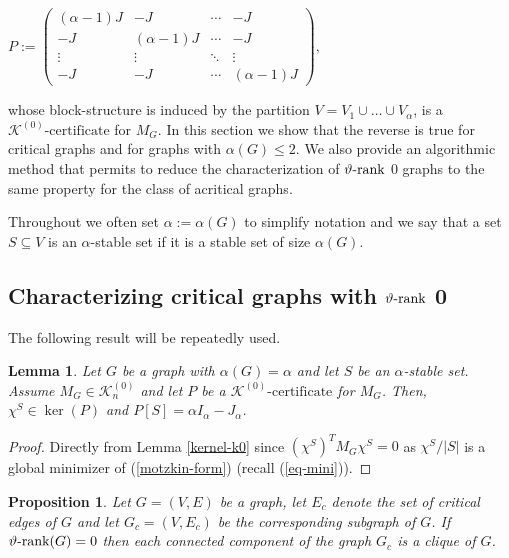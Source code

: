 \documentclass[11pt]{article}
\newtheorem{lemma}[theorem]{Lemma}
\newtheorem{proposition}[theorem]{Proposition}
\newcommand{\kzero}{\mathcal{K}_n^{(0)}}
\newcommand{\kzeroc}{\MK^{(0)}\text{-certificate}}
\numberwithin{equation}{section}
\newcommand{\MK}{{\mathcal K}}
\newcommand{\rrank}{\vartheta\text{\rm -rank}}
\begin{document}
\begin{center}
    $P:=\begin{pmatrix}
(\alpha-1)J & -J & \cdots & -J \\
-J & (\alpha-1)J& \cdots & -J \\
\vdots  & \vdots  & \ddots & \vdots  \\
-J & -J & \cdots & (\alpha-1)J 
\end{pmatrix}, $
\end{center}
whose block-structure is  induced by the partition $V=V_1\cup \dots \cup V_\alpha$,
is a $\kzeroc$ for $M_G$.
 In this section we show that the reverse is true for critical graphs and for graphs with $\alpha(G)\le 2$. We also provide an algorithmic method that permits to reduce the characterization of $\rrank$ 0 graphs to the same property for the class of acritical graphs.
 
  Throughout we often set $\alpha:=\alpha(G)$ to simplify notation and we say that a set $S\subseteq V$ is an $\alpha$-stable set if it is a stable set of size $\alpha(G)$. 

\subsection{Characterizing critical graphs with $\rrank$ 0}

The following  result will be repeatedly used.

\begin{lemma}\label{lem-kernel}
Let $G$ be a graph  with $\alpha(G)=\alpha$ and let $S$ be an $\alpha$-stable set. Assume $M_G\in \kzero$ and let $P$ be a $\kzeroc$ for $M_G$. Then, $\chi^S \in \ker(P)$ and $P[S]=\alpha I_{\alpha}-J_{\alpha}$.
\end{lemma}
\begin{proof}
Directly from Lemma \ref{kernel-k0} since $(\chi^S)^T M_G \chi^S =0$ as $\chi^S/|S|$ is a global minimizer of (\ref{motzkin-form}) (recall  (\ref{eq-mini})).
\end{proof}

\begin{proposition}\label{lem-components_critical}
Let $G=(V,E)$ be a graph, let $E_c$ denote the set of critical edges of $G$ and let $G_c=(V,E_c)$ be the corresponding subgraph of $G$. If  $\rrank(G)=0$ then each  connected component of the graph $G_c$ is a  clique of $G$.
\end{proposition}
\end{document}
